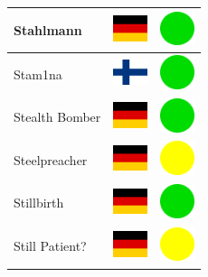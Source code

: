 \documentclass[12pt, a4paper, twoside]{report}
\begin{document}
\begin{center}
\begin{longtable}{|p{5cm}|p{2cm}|p{2cm}|}
 Stahlmann                                                  & \includegraphics[width=1cm]{../img/flags/de} &   \includegraphics[width=1cm]{../likes/y} \\ \hline
 Stam1na                                                    & \includegraphics[width=1cm]{../img/flags/fi} &   \includegraphics[width=1cm]{../likes/y} \\ \hline
 Stealth Bomber                                             & \includegraphics[width=1cm]{../img/flags/de} &   \includegraphics[width=1cm]{../likes/y} \\ \hline
 Steelpreacher                                              & \includegraphics[width=1cm]{../img/flags/de} &   \includegraphics[width=1cm]{../likes/m} \\ \hline
 Stillbirth                                                 & \includegraphics[width=1cm]{../img/flags/de} &   \includegraphics[width=1cm]{../likes/y} \\ \hline
 Still Patient?                                             & \includegraphics[width=1cm]{../img/flags/de} &   \includegraphics[width=1cm]{../likes/m} \\ \hline

\end{longtable}
\end{center}
\end{document}
